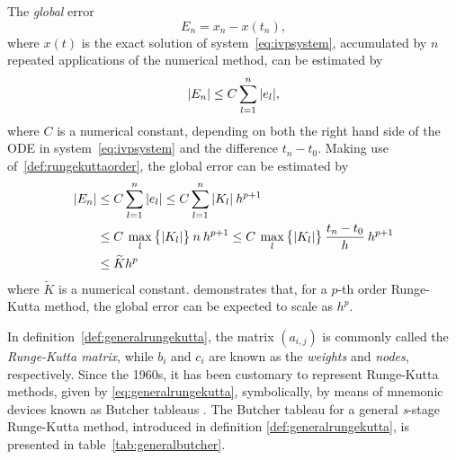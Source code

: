 The \emph{global} error
\begin{equation}
    \label{eq:rungekuttaglobalorderdef}
    E_{n} = x_{n}-x(t_{n}),
\end{equation}
where $x(t)$ is the exact solution of system~\eqref{eq:ivpsystem}, accumulated
by $n$ repeated applications of the numerical method, can be estimated by
\begin{equation}
    \label{eq:rungekuttaglobalorderapprox}
    \abs{E_{n}} \leq C\sum\limits_{l=1}^{n}\abs{e_{l}},
\end{equation}
where $C$ is a numerical constant, depending on both the right hand side of
the ODE in system~\eqref{eq:ivpsystem} and the difference $t_{n}-t_{0}$.
Making use of~\cref{def:rungekuttaorder}, the global error can be estimated
by
\begin{gather}
    \label{eq:rungekuttaglobalorderestimate}
    \begin{aligned}
        \abs{E_{n}}&\leq C\sum\limits_{l=1}^{n}\abs{e_{l}} %
        \leq C\sum\limits_{l=1}^{n}\abs{K_{l}}\hspace{0.5ex}h^{p+1} \\
        &\leq C\hspace{0.5ex}\max\limits_{l}\big\{\abs{K_{l}}\big\}\hspace{0.5ex}n\hspace{0.5ex}h^{p+1}%
        \leq C\hspace{0.5ex}\max\limits_{l}\big\{\abs{K_{l}}\big\}\hspace{0.5ex}\frac{t_{n}-t_{0}}{h}\hspace{0.5ex}h^{p+1}\\
        &\leq \widetilde{K}h^{p}
    \end{aligned}
\end{gather}
where $\widetilde{K}$ is a numerical constant.
 demonstrates that, for a $p$-th
order Runge-Kutta method, the global error can be expected to scale
as $h^{p}$.

%
In definition~\ref{def:generalrungekutta}, the matrix $(a_{i,j})$ is commonly
called the \emph{Runge-Kutta matrix}, while $b_{i}$ and $c_{i}$ are known as
the \emph{weights} and \emph{nodes}, respectively.  Since the 1960s, it has
been customary to represent Runge-Kutta methods, given by
\cref{eq:generalrungekutta}, symbolically, by means of mnemonic devices known
as Butcher tableaus \parencite[p.134]{hairer1993solving}. The Butcher tableau
for a general \emph{s}-stage Runge-Kutta method, introduced in definition
\ref{def:generalrungekutta}, is presented in table~\ref{tab:generalbutcher}.

